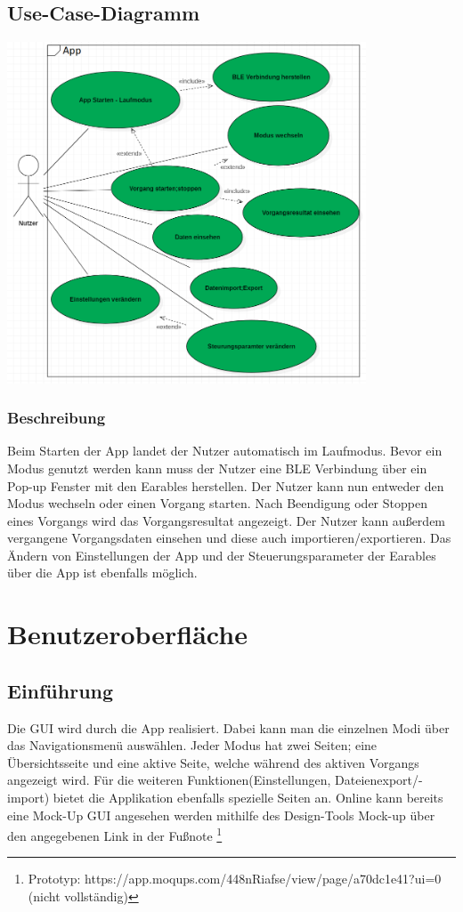 \documentclass[a4paper,12pt]{article}
\begin{document}
  \subsection{Use-Case-Diagramm}
  \begin{center}
	\includegraphics[width=0.8\textwidth]{./Diagramme/Use-CaseDiagramm.png} 
  \end{center}

\subsubsection{Beschreibung} 
Beim Starten der App landet der Nutzer automatisch im Laufmodus. Bevor ein Modus genutzt werden kann muss der Nutzer eine BLE Verbindung über ein Pop-up Fenster mit den \Gls{Earables} herstellen. Der Nutzer kann nun entweder den Modus wechseln oder einen \Gls{Vorgang} starten. Nach Beendigung oder Stoppen eines Vorgangs wird das Vorgangsresultat angezeigt. Der Nutzer kann außerdem vergangene Vorgangsdaten einsehen und diese auch importieren/exportieren. Das Ändern von Einstellungen der App und der \Gls{Steuerungsparameter} der \Gls{Earables} über die App ist ebenfalls möglich.
\section{Benutzeroberfläche}
\subsection{Einführung}
Die \Gls{GUI} wird durch die App realisiert. Dabei kann man die einzelnen Modi über das Navigationsmenü auswählen. Jeder Modus hat zwei Seiten; eine Übersichtsseite und eine aktive Seite, welche während des aktiven \Gls{Vorgang}s angezeigt wird. Für die weiteren Funktionen(Einstellungen, Dateienexport/-import) bietet die Applikation ebenfalls spezielle Seiten an.
Online kann bereits eine Mock-Up \Gls{GUI} angesehen werden mithilfe des Design-Tools \glqq Mock-up\grqq{} über den angegebenen Link in der Fußnote \footnote[1]{Prototyp: https://app.moqups.com/448nRiafse/view/page/a70dc1e41?ui=0 (nicht vollständig)}
\end{document}
